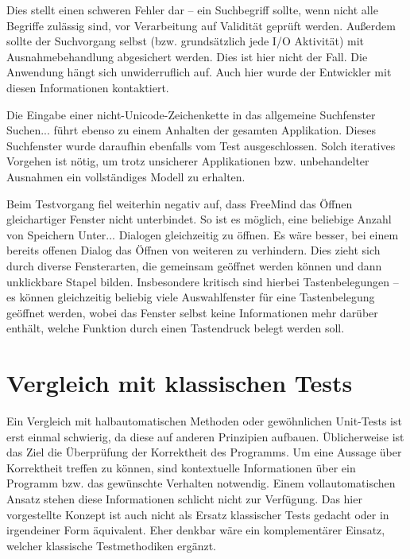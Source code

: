 Dies stellt einen schweren Fehler dar -- ein Suchbegriff sollte,
wenn nicht alle Begriffe zulässig sind, vor Verarbeitung auf
Validität geprüft werden. Außerdem sollte der Suchvorgang
selbst (bzw. grundsätzlich jede I/O Aktivität) mit Ausnahmebehandlung
abgesichert werden. Dies ist hier nicht der Fall. Die Anwendung
hängt sich unwiderruflich auf. Auch hier wurde der Entwickler
mit diesen Informationen kontaktiert.


Die Eingabe einer nicht-Unicode-Zeichenkette in das allgemeine
Suchfenster \glqq{}Suchen...\grqq{} führt ebenso zu einem
Anhalten der gesamten Applikation. Dieses Suchfenster wurde daraufhin
ebenfalls vom Test ausgeschlossen. Solch iteratives Vorgehen ist
nötig, um trotz unsicherer Applikationen bzw. unbehandelter Ausnahmen 
ein vollständiges Modell zu erhalten.

Beim Testvorgang fiel weiterhin negativ auf, dass FreeMind das Öffnen gleichartiger
Fenster nicht unterbindet. So ist es möglich, eine beliebige Anzahl von
\glqq{}Speichern Unter...\grqq{} Dialogen gleichzeitig zu öffnen. Es wäre besser, bei einem bereits
offenen Dialog das Öffnen von weiteren zu verhindern. Dies zieht sich durch
diverse Fensterarten, die gemeinsam geöffnet werden können und dann
unklickbare \glqq{}Stapel\grqq{} bilden. Insbesondere kritisch sind
hierbei Tastenbelegungen -- es können gleichzeitig beliebig viele
Auswahlfenster für eine Tastenbelegung geöffnet werden, wobei das
Fenster selbst keine Informationen mehr darüber enthält, welche Funktion
durch einen Tastendruck belegt werden soll.



\section{Vergleich mit klassischen Tests}\label{section:testcomparisonclassic}

Ein Vergleich mit halbautomatischen Methoden oder gewöhnlichen Unit-Tests
ist erst einmal schwierig, da diese auf anderen Prinzipien aufbauen.
Üblicherweise ist das Ziel die Überprüfung der Korrektheit des Programms.
Um eine Aussage über Korrektheit treffen zu können, sind kontextuelle
Informationen über ein Programm bzw. das gewünschte Verhalten notwendig.
Einem vollautomatischen Ansatz stehen diese Informationen schlicht nicht
zur Verfügung. Das hier vorgestellte Konzept ist auch nicht als Ersatz 
klassischer Tests gedacht oder in irgendeiner Form äquivalent.
Eher denkbar wäre ein komplementärer Einsatz, welcher klassische
Testmethodiken ergänzt.

